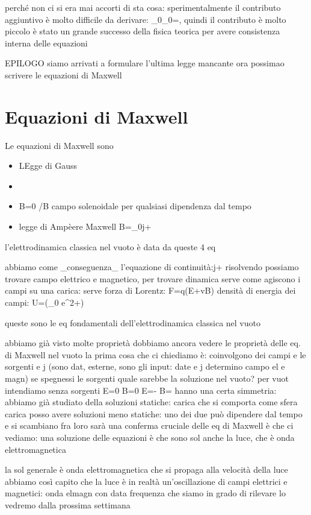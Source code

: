 perché non ci si era mai accorti di sta cosa: sperimentalmente il contributo aggiuntivo è molto difficile da derivare: \mu_0\epsilon_0=, quindi il contributo è molto piccolo
è stato un grande successo della fisica teorica per avere consistenza interna delle equazioni


EPILOGO
siamo arrivati a formulare l'ultima legge mancante
ora possimao scrivere le equazioni di Maxwell
\section{Equazioni di Maxwell}
Le equazioni di Maxwell sono
\begin{itemize}
	\item LEgge di Gauss
	\item
	\item \div\vba B=0 /\vba B campo solenoidale per qualsiasi dipendenza dal tempo
	\item legge di Ampèere Maxwell \curl\vba B=\mu_0\vba j+ 
\end{itemize}
l'elettrodinamica classica nel vuoto è data da queste 4 eq

abbiamo come _conseguenza_ l'equazione di continuità:\div\vba j+
risolvendo possiamo trovare campo elettrico e magnetico, per trovare dinamica serve come agiscono i campi su una carica: serve forza di Lorentz: \vba F=q(\vba E+\vba v\cross\vba B)
densità di energia dei campi: U=(\epsilon_0 e^2+)

queste sono le eq fondamentali dell'elettrodinamica classica nel vuoto

abbiamo già visto molte proprietà
dobbiamo ancora vedere le proprietà delle eq. di Maxwell nel vuoto
la prima cosa che ci chiediamo è: coinvolgono dei campi e le sorgenti \rho e j (sono dat, esterne, sono gli input: date \rho e \vba j determino campo el e magn) se spegnessi le sorgenti quale sarebbe la soluzione nel vuoto?
per vuot intendiamo senza sorgenti
\div\vba E=0
\div\vba B=0
\curl\vba E=-
\curl\vba B= 
hanno una certa simmetria: abbiamo già studiato della soluzioni statiche: carica che si comporta come sfera carica
posso avere soluzioni meno statiche: uno dei due può dipendere dal tempo e si scambiano fra loro
sarà una conferma cruciale delle eq di Maxwell è che ci vediamo: una soluzione delle equazioni è che sono sol anche la luce, che è onda elettromagnetica

la sol generale è onda elettromagnetica che si propaga alla velocità della luce
abbiamo così capito che la luce è in realtà un'oscillazione di campi elettrici e magnetici: onda elmagn con data frequenza che siamo in grado di rilevare
lo vedremo dalla prossima settimana

